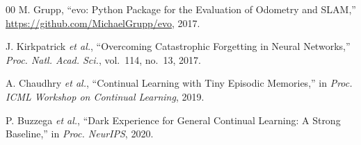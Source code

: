 \documentclass[conference]{IEEEtran}
\begin{document}
\begin{thebibliography}{00}
 M. Grupp, ``evo: Python Package for the Evaluation of Odometry and SLAM,'' \url{https://github.com/MichaelGrupp/evo}, 2017.

 J. Kirkpatrick \textit{et al.}, ``Overcoming Catastrophic Forgetting in Neural Networks,'' \textit{Proc. Natl. Acad. Sci.}, vol.~114, no.~13, 2017.

 A. Chaudhry \textit{et al.}, ``Continual Learning with Tiny Episodic Memories,'' in \textit{Proc. ICML Workshop on Continual Learning}, 2019.

 P. Buzzega \textit{et al.}, ``Dark Experience for General Continual Learning: A Strong Baseline,'' in \textit{Proc. NeurIPS}, 2020.

\end{thebibliography}
\end{document}
